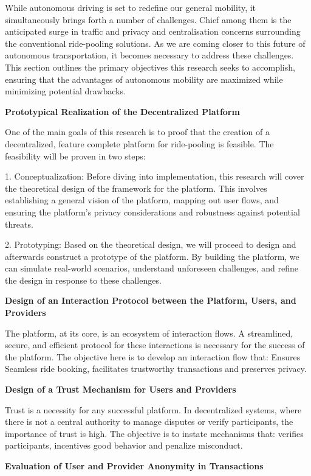 While autonomous driving is set to redefine our general mobility, it simultaneously brings forth a number of challenges. Chief among them is the anticipated surge in traffic and privacy and centralisation concerns surrounding the conventional ride-pooling solutions. As we are coming closer to this future of autonomous transportation, it becomes necessary to address these challenges. This section outlines the primary objectives this research seeks to accomplish, ensuring that the advantages of autonomous mobility are maximized while minimizing potential drawbacks.


\textbf{Prototypical Realization of the Decentralized Platform}

One of the main goals of this research is to proof that the creation of a decentralized, feature complete platform for ride-pooling is feasible.  The feasibility will be proven in two steps:

1. Conceptualization: Before diving into implementation, this research will cover the theoretical design of the framework for the platform. This involves establishing a general vision of the platform, mapping out user flows, and ensuring the platform's privacy considerations and robustness against potential threats.

2. Prototyping: Based on the theoretical design, we will proceed to design and afterwards construct a prototype of the platform. By building the platform,  we can simulate real-world scenarios, understand unforeseen challenges, and refine the design in response to these challenges.


\textbf{Design of an Interaction Protocol between the Platform, Users, and Providers}

The platform, at its core, is an ecosystem of interaction flows.  A streamlined, secure, and efficient protocol for these interactions is necessary for the success of the platform. The objective here is to develop an interaction flow that: Ensures Seamless ride booking, facilitates trustworthy transactions and preserves privacy.


\textbf{Design of a Trust Mechanism for Users and Providers}

Trust is a necessity for any successful platform. In decentralized systems, where there is not a central authority to manage disputes or verify participants, the importance of trust is high. The objective is to instate mechanisms that: verifies participants, incentives good behavior and penalize misconduct.


\textbf{Evaluation of User and Provider Anonymity in Transactions}

